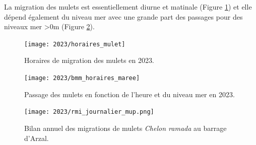 \documentclass[11pt,twocolumn,titlepage,twoside]{article}\usepackage[]{graphicx}\usepackage[]{color}
\begin{document}

La migration des mulets
est essentiellement diurne et matinale (Figure \ref{horaires_mulet}) et elle
dépend également du niveau mer avec une grande part des passages pour des niveaux mer
>0m (Figure \ref{horaires_maree_mulet}).

\begin{figure}[htpb]
\centering
\texttt{[image: 2023/horaires\_mulet]} 
\caption{Horaires de migration des mulets en 2023.}
\label{horaires_mulet}
\end{figure}



\begin{figure}[htpb]
\centering
\texttt{[image: 2023/bmm\_horaires\_maree]} 
\caption{Passage des mulets en fonction de l'heure et du niveau mer en
2023.}
\label{horaires_maree_mulet}
\end{figure}


\clearpage
\onecolumn

\begin{landscape}
\begin{figure}[htpb]
\centering
\texttt{[image: 2023/rmi\_journalier\_mup.png]} 
\caption{Bilan annuel des migrations de mulets \textit{Chelon ramada} au barrage
d'Arzal.}
\label{rmi_journalier_mup}
\end{figure}
\end{landscape}




















\clearpage
\twocolumn
\end{document}

